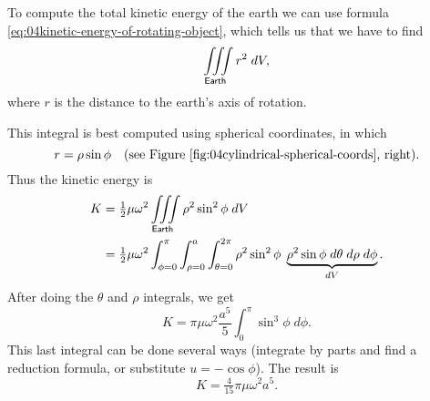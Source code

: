 To compute the total kinetic energy of the earth we can use formula
\eqref{eq:04kinetic-energy-of-rotating-object}, which tells us that we
have to find
\[
\iiint\limits_{\sf Earth} r^2 \; dV,
\]
where $r$ is the distance to the earth's axis of rotation.

This integral is best computed using spherical coordinates, in which
\[
r = \rho\sin\phi   \quad\text{(see
Figure~\ref{fig:04cylindrical-spherical-coords}, right)}.
\]
Thus the kinetic energy is 
\begin{align*}
  K &= \tfrac12\mu\omega^2 \iiint\limits_{\sf Earth} \rho^2\sin^2\phi \;
  dV\\
  &=
  \tfrac12\mu\omega^2 
  \int_{\phi=0}^\pi \int_{\rho=0}^a \int_{\theta=0}^{2\pi}
  \rho^2\sin^2\phi\;
  \underbrace{\rho^2 \sin\phi \; d\theta\; d\rho\; d\phi}_{dV}.
\end{align*}
After doing the $\theta$ and $\rho$ integrals, we get
\[
K = \pi\mu\omega^2 \frac{a^5}5
\int_0^\pi \sin^3\phi \; d\phi.
\]
This last integral can be done several ways (integrate by parts and
find a reduction formula, or substitute $u = -\cos \phi$).  The result is  
\[
K = \tfrac4{15} \pi \mu \omega^2 a^5.
\]



